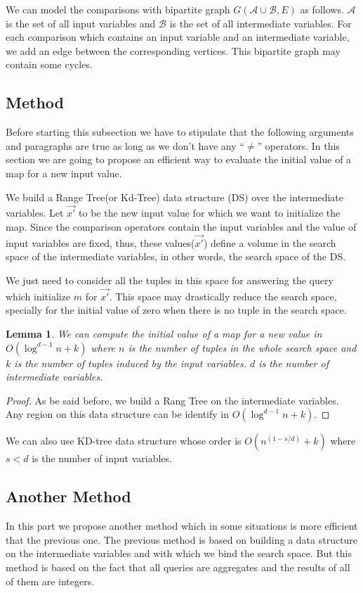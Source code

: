 \documentclass[12pt]{article}
\newtheorem{lemma}{Lemma}
\begin{document}
We can model the comparisons with bipartite graph $G(\mathcal{A}\cup \mathcal{B}, E)$ as follows. $\mathcal{A}$ is the set of all input variables and $\mathcal{B}$ is the set of all intermediate variables. For each comparison which contains an input variable and an intermediate variable, we add an edge between the corresponding vertices. This bipartite graph may contain some cycles.

\subsection{Method}
Before starting this subsection we have to stipulate that the following arguments and paragraphs are true as long as we don't have any ``$\neq$'' operators.
In this section we are going to propose an efficient way to evaluate the initial value of a map for a new input value.

We build a Range Tree(or Kd-Tree) data structure (DS) over the intermediate variables. Let $\vec{x'}$ to be the new input value for which we want to initialize the map. Since the comparison operators contain the input variables and the value of input variables are fixed, thus, these values($\vec{x'}$) define a volume in the search space of the intermediate variables, in other words, the search space of the DS.

We just need to consider all the tuples in this space for answering the query which initialize $m$ for $\vec{x'}$. This space may drastically reduce the search space, specially for the initial value of zero when there is no tuple in the search space.

\begin{lemma}
\label{lemma1}
We can compute the initial value of a map for a new value in $O(\log^{d-1}{n} +k)$ where $n$ is the number of tuples in the whole search space and $k$ is the number of tuples induced by the input variables. $d$ is the number of intermediate variables.
\end{lemma}
\begin{proof}
As be said before, we build a Rang Tree on the intermediate variables. Any region on this data structure can be identify in $O(\log^{d-1}{n}+k)$. 
\end{proof}
We can also use KD-tree data structure whose order is $O(n^{(1-s/d)}+k)$ where $s<d$  is the number of input variables. 
\subsection{Another Method}
In this part we propose another method which in some situations is more efficient that the previous one. The previous method is based on building a data structure on the intermediate variables and with which we bind the search space. But this method is based on the fact that all queries are aggregates and the results of all of them are integers. \par
\end{document}
